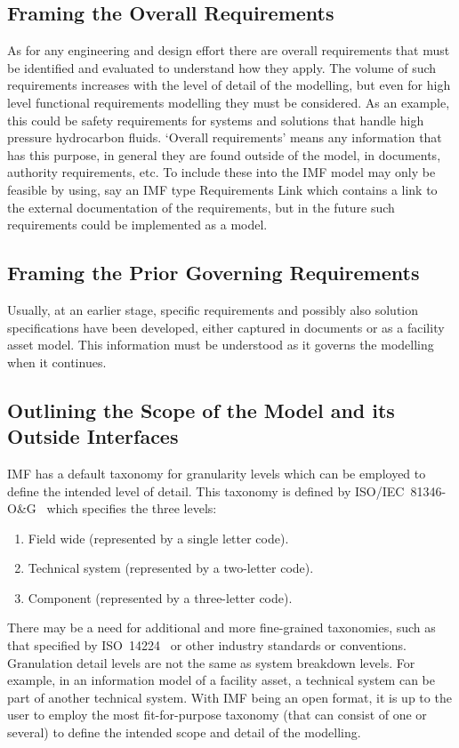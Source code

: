 \documentclass[../main.tex]{subfiles}
\begin{document}
\subsection{Framing the Overall Requirements}
As for any engineering and design effort there are overall requirements that must be
identified and evaluated to understand how they apply. The volume of such requirements increases with the level of
detail of the modelling, but even for high level functional requirements modelling they must be considered. As an
example, this could be safety requirements for systems and solutions that handle high pressure hydrocarbon fluids. `Overall requirements' means any information that has this purpose, in general they are found outside of the model, in documents, authority requirements, etc. To include these into the IMF model may only be feasible by using, say an IMF type Requirements Link which contains a link to the external documentation of the requirements, but in the future such requirements could be implemented as a model.

\subsection{Framing the Prior Governing Requirements}
Usually, at an earlier stage, specific requirements and possibly also solution
specifications have been developed, either captured in documents or as a facility asset model. This information must
be understood as it governs the modelling when it continues.

\subsection{Outlining the Scope of the Model and its Outside Interfaces}
IMF has a default taxonomy for granularity levels which can be employed to define the
intended level of detail. This taxonomy is defined by ISO/IEC~81346-O\&G~\cite{81346-OG} which specifies the three levels:

\begin{enumerate}
  \item Field wide (represented by a single letter code).
  \item Technical system (represented by a two-letter code).
  \item Component (represented by a three-letter code).
\end{enumerate}
There may be a need for additional and more fine-grained taxonomies, such as that specified by ISO~14224~\cite{14224} or other
industry standards or conventions. Granulation detail levels are not the same as system breakdown levels. For
example, in an information model of a facility asset, a technical system can be part of another technical system.
With IMF being an open format, it is up to the user to employ the most fit-for-purpose taxonomy (that can consist of
one or several) to define the intended scope and detail of the modelling.
\end{document}
